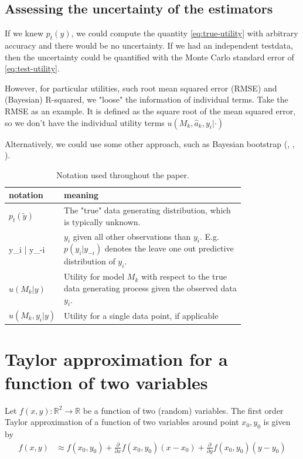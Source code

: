 \documentclass{article}
\begin{document}
\subsection{Assessing the uncertainty of the estimators}
If we knew $p_t(y)$, we could compute the quantity \eqref{eq:true-utility} with arbitrary accuracy and there would be no uncertainty. If we had an independent testdata, then the uncertainty could be quantified with the Monte Carlo standard error of \eqref{eq:test-utility}. 

However, for particular utilities, such root mean squared error (RMSE) and (Bayesian) R-squared, we "loose" the information of individual terms. Take the RMSE as an example. It is defined as the square root of the mean squared error, so we don't have the individual utility terms $u(M_k, \hat{a}_k, y_i | \cdot)$

Alternatively, we could use some other approach, such as Bayesian bootstrap (\cite{rubin_bayesian_1981}, \cite{vehtari_bayesian_2002}, \cite{vehtari_survey_2012}).

\begin{table}[]
    \centering
    \begin{tabular}{l | p{0.8\linewidth}}
    \toprule
        notation & meaning \\ \midrule
        $p_t(\tilde{y})$ & The "true" data generating distribution, which is typically unknown. \\
        y_i | y_{-i} & $y_i$ given all other observations than $y_i$. E.g. $p(y_i | y_{-i})$ denotes the leave one out predictive distribution of $y_i$. \\
        $ u(M_k | y) $ & Utility for model $M_k$ with respect to the true data generating process given the observed data $y_i$. \\
        $u(M_k, y_i | y)$ & Utility for a single data point, if applicable
        
    \end{tabular}
    \caption{Notation used throughout the paper.}
    \label{tab:notation}
\end{table}

\section{Taylor approximation for a function of two variables}

Let $f(x, y): \mathbb{R}^2 \rightarrow \mathbb{R}$ be a function of two (random) variables. The first order Taylor approximation of a function of two variables around point $x_0, y_0$ is given by
\begin{align}
    f(x, y) &\approx f(x_0, y_0) + \frac{\partial }{\partial x} f(x_0, y_0) (x - x_0) + \frac{\partial }{\partial y} f(x_0, y_0) (y - y_0) \label{tapprox}
\end{align}
\end{document}
